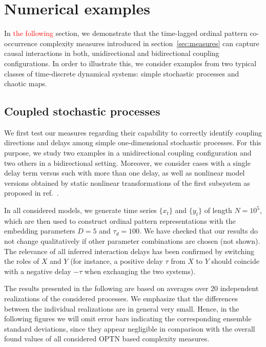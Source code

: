 \documentclass[12pt,aip,cha,reprint,nofootinbib]{revtex4-1}
\begin{document}
\section{Numerical examples} \label{sec:res}
In \textcolor{red}{the following} section, we demonstrate that the time-lagged ordinal pattern co-occurrence complexity measures introduced in section~\textcolor{red}{\ref{sec:measures}} can capture causal interactions in both, unidirectional and bidirectional coupling configurations. In order to illustrate this, we consider examples from two typical classes of time-discrete dynamical systems: simple stochastic processes and chaotic maps. 

\subsection{Coupled stochastic processes} \label{sec:GCs}
We first test our measures regarding their capability to correctly identify coupling directions and delays among simple one-dimensional stochastic processes. For this purpose, we study two examples in a unidirectional coupling configuration and two others in a bidirectional setting. Moreover, we consider cases with a single delay term versus such with more than one delay, as well as nonlinear model versions obtained by static nonlinear transformations of the first subsystem as proposed in ref.~\cite{LiPRE2018}.

In all considered models, we generate time series $\{ x_t \}$ and $\{ y_t \}$ of length $N=10^{5}$, which are then used to construct ordinal pattern representations with the embedding parameters $D = 5$ and $\tau_d = 100$. We have checked that our results do not change qualitatively if other parameter combinations are chosen (not shown). The relevance of all inferred interaction delays has been confirmed by switching the roles of $X$ and $Y$ (for instance, a positive delay $\tau$ from $X$ to $Y$ should coincide with a negative delay $-\tau$ when exchanging the two systems). 

The results presented in the following are based on averages over 20 independent realizations of the considered processes. {\color{red}We emphasize that the differences between the individual realizations are in general very small. Hence, in the following figures we will omit error bars indicating the corresponding ensemble standard deviations, since they appear negligible in comparison with the overall found values of all considered OPTN based complexity measures.}
\end{document}
